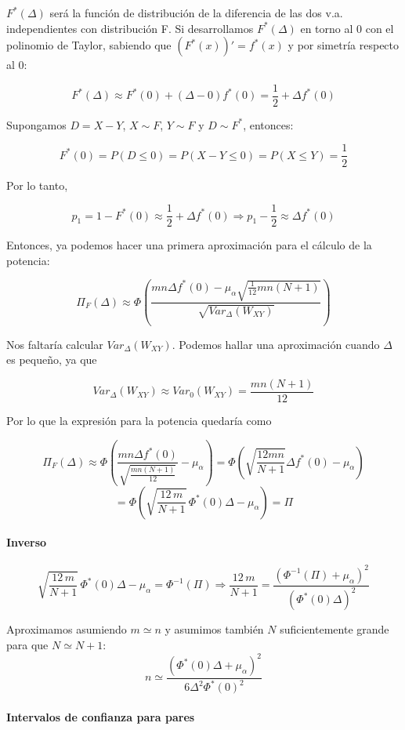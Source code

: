 $F^*(\Delta)$ será la función de distribución de la diferencia de las dos v.a. independientes con distribución F. Si desarrollamos $F^*(\Delta)$ en torno al 0 con el polinomio de Taylor, sabiendo que $(F^*(x))'=f^*(x)$ y por simetría respecto al 0:

$$
    F^*(\Delta)\approx F^*(0)+(\Delta-0) f^*(0)=\frac{1}{2}+\Delta f^*(0)
$$

Supongamos $D=X-Y$, $X\sim F$, $Y\sim F$ y $D\sim F^*$, entonces:

$$
    F^*(0)=P(D\leq 0)=P(X-Y\leq 0)=P(X\leq Y)=\frac{1}{2}
$$

Por lo tanto,

$$
    p_1=1-F^*(0)\approx\frac{1}{2}+\Delta f^*(0) \Longrightarrow p_1-\frac{1}{2}\approx \Delta f^*(0)
$$

Entonces, ya podemos hacer una primera aproximación para el cálculo de la potencia:

$$
    \Pi_F(\Delta)\approx \Phi\left(\frac{mn\Delta f^*(0)-\mu_\alpha\sqrt{\frac{1}{12}mn(N+1)}}{\sqrt{Var_\Delta(W_{XY})}}\right)
$$

Nos faltaría calcular $Var_\Delta(W_{XY})$. Podemos hallar una aproximación cuando $\Delta$ es pequeño, ya que 

$$
    Var_\Delta(W_{XY})\approx Var_0(W_{XY})=\frac{mn(N+1)}{12}
$$

\newpage

Por lo que la expresión para la potencia quedaría como

$$
    \Pi_F(\Delta)\approx\Phi\left(\frac{mn\Delta f^*(0)}{\sqrt{\frac{mn(N+1)}{12}}}-\mu_\alpha\right)=\Phi\left(\sqrt{\frac{12mn}{N+1}}\Delta f^*(0)-\mu_\alpha\right)
$$
\[
    =\Phi\left(\sqrt{\frac{12 \, m}{N+1}} \, \Phi^*(0) \Delta - \mu_\alpha\right) = \Pi
\]

\paragraph{Inverso}

\[
    \sqrt{\frac{12 \, m}{N+1}} \, \Phi^*(0) \Delta - \mu_\alpha = \Phi^{-1}(\Pi)
    \Longrightarrow 
    \frac{12 \, m}{N+1} = \frac{\left(\Phi^{-1}(\Pi) + \mu_\alpha\right)^2}{\left(\Phi^*(0) \Delta\right)^2}
\]

Aproximamos asumiendo $m \simeq  n$ y asumimos también $N$ suficientemente grande para que $N \simeq N+1$:
\[
    n \simeq \frac{\left(\Phi^*(0) \Delta + \mu_\alpha\right)^2}{6 \Delta^2 \Phi^*(0)^2}
\]

\paragraph{Intervalos de confianza para pares}

